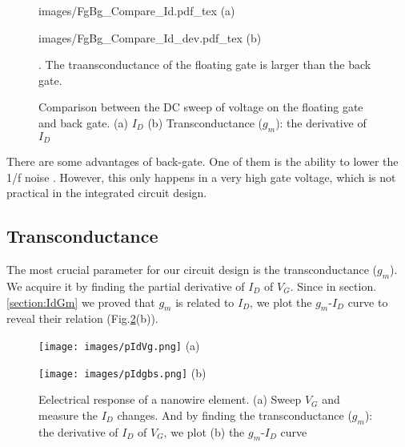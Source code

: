 \begin{figure}[!htbp]
    \centering
    \begin{minipage}[t][0.1\textheight]{0.4\textheight}
        \centering
        \def\svgwidth{14cm}
        \fontsize{6}{15}\selectfont
         {images/FgBg_Compare_Id.pdf_tex}
        (a)
    \end{minipage}
    \hfill
    \begin{minipage}[t][0.1\textheight]{0.4\textheight}
        \centering
        \def\svgwidth{14cm}
        \fontsize{6}{15}\selectfont
         {images/FgBg_Compare_Id_dev.pdf_tex}
        (b)
    \end{minipage}
    \caption{Comparison between the DC sweep of voltage on the floating gate and back gate. (a) $I_D$ (b) Transconductance ($g_m$): the derivative of $I_D$}. The traansconductance of the floating gate is larger than the back gate.
    \label{fig:IdVgandgbsId}
\end{figure}


There are some advantages of back-gate.
One of them is the ability to lower the 1/f noise \cite{C7, C8}.
However, this only happens in a very high gate voltage, which is not practical in the integrated circuit design.

\subsection{Transconductance}
The most crucial parameter for our circuit design is the transconductance ($g_m$).
We acquire it by finding the partial derivative of $I_D$ of $V_{G}$.
Since in section.\ref{section:IdGm} we proved that $g_m$ is related to $I_D$, we plot the $g_m$-$I_D$ curve to reveal their relation (Fig.\ref{fig:pIdVg}(b)).

\begin{figure}[!htbp]
    \centering
    \begin{minipage}[t][0.1\textheight]{1\textwidth}
        \centering
        \texttt{[image: images/pIdVg.png]}
        (a)
    \end{minipage}
    \hfill
    \begin{minipage}[t][0.1\textheight]{1\textwidth}
        \centering
        \texttt{[image: images/pIdgbs.png]}
        (b)
    \end{minipage}
    \caption{Eelectrical response of a nanowire element. (a) Sweep $V_G$ and measure the $I_D$ changes. And by finding the transconductance ($g_m$): the derivative of $I_D$ of $V_G$, we plot (b) the $g_m$-$I_D$ curve}
    \label{fig:pIdVg}
\end{figure}

